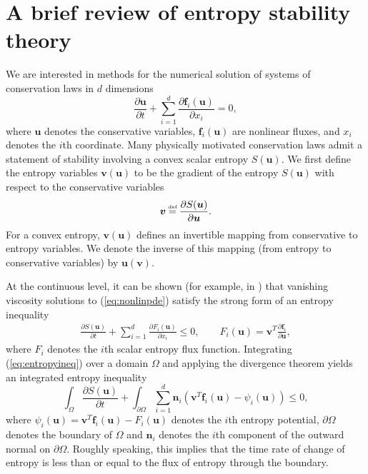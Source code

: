 \documentclass[onefignum,onetabnum,final]{siamart171218}
\newcommand{\pd}[2]{\frac{\partial#1}{\partial#2}}
\newcommand{\LRp}[1]{\left( #1 \right)}
\newcommand\myeq{\mathrel{\stackrel{\makebox[0pt]{\mbox{\normalfont\tiny def}}}{=}}}
\begin{document}
\section{A brief review of entropy stability theory}
\label{sec:0}

We are interested in methods for the numerical solution of systems of conservation laws in $d$ dimensions
\begin{equation}
\pd{\bm{u}}{t} + \sum_{i=1}^d \pd{\bm{f}_i\LRp{\bm{u}}}{x_i} = 0,
\label{eq:nonlinpde}
\end{equation}
where $\bm{u}$ denotes the conservative variables, $\bm{f}_i(\bm{u})$ are nonlinear fluxes, and $x_i$ denotes the $i$th coordinate.  Many physically motivated conservation laws admit a statement of stability involving a convex scalar entropy $S(\bm{u})$.  We first define the entropy variables $\bm{v}(\bm{u})$ to be the gradient of the entropy $S(\bm{u})$ with respect to the conservative variables 
\[
\bm{v} \myeq \pd{S(\bm{u})}{\bm{u}}.  
\]
For a convex entropy, $\bm{v}(\bm{u})$ defines an invertible mapping from conservative to entropy variables.  We denote the inverse of this mapping (from entropy to conservative variables) by $\bm{u}(\bm{v})$.  

At the continuous level, it can be shown (for example, in \cite{dafermos2005compensated}) that vanishing viscosity solutions to (\ref{eq:nonlinpde}) satisfy the strong form of an entropy inequality 
\begin{gather}
\pd{S(\bm{u})}{t} + \sum_{i=1}^d \pd{F_i(\bm{u})}{x_i} \leq 0, \qquad F_i(\bm{u}) = \bm{v}^T\pd{\bm{f}_i}{\bm{u}}, 
\label{eq:entropyineq}
\end{gather}
where $F_i$ denotes the $i$th scalar entropy flux function.  Integrating (\ref{eq:entropyineq}) over a domain $\Omega$ and applying the divergence theorem yields an integrated entropy inequality
\begin{equation}
\int_{\Omega} \pd{S(\bm{u})}{t} + \int_{\partial \Omega} \sum_{i=1}^d \bm{n}_i \LRp{\bm{v}^T\bm{f}_i(\bm{u}) - \psi_i(\bm{u})} \leq 0,
\label{eq:weakentropyineq}
\end{equation}
where $\psi_i(\bm{u}) = \bm{v}^T\bm{f}_i(\bm{u}) - F_i(\bm{u})$ denotes the $i$th entropy potential, $\partial \Omega$ denotes the boundary of $\Omega$ and $\bm{n}_i$ denotes the $i$th component of the outward normal on $\partial \Omega$.  Roughly speaking, this implies that the time rate of change of entropy is less than or equal to the flux of entropy through the boundary.
\end{document}
